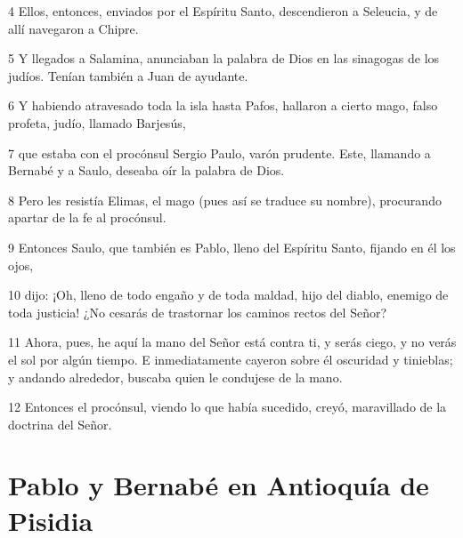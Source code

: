 \par 4 Ellos, entonces, enviados por el Espíritu Santo, descendieron a Seleucia, y de allí navegaron a Chipre.
\par 5 Y llegados a Salamina, anunciaban la palabra de Dios en las sinagogas de los judíos. Tenían también a Juan de ayudante.
\par 6 Y habiendo atravesado toda la isla hasta Pafos, hallaron a cierto mago, falso profeta, judío, llamado Barjesús,
\par 7 que estaba con el procónsul Sergio Paulo, varón prudente. Este, llamando a Bernabé y a Saulo, deseaba oír la palabra de Dios.
\par 8 Pero les resistía Elimas, el mago (pues así se traduce su nombre), procurando apartar de la fe al procónsul.
\par 9 Entonces Saulo, que también es Pablo, lleno del Espíritu Santo, fijando en él los ojos,
\par 10 dijo: ¡Oh, lleno de todo engaño y de toda maldad, hijo del diablo, enemigo de toda justicia! ¿No cesarás de trastornar los caminos rectos del Señor?
\par 11 Ahora, pues, he aquí la mano del Señor está contra ti, y serás ciego, y no verás el sol por algún tiempo. E inmediatamente cayeron sobre él oscuridad y tinieblas; y andando alrededor, buscaba quien le condujese de la mano.
\par 12 Entonces el procónsul, viendo lo que había sucedido, creyó, maravillado de la doctrina del Señor.

\section*{Pablo y Bernabé en Antioquía de Pisidia}

